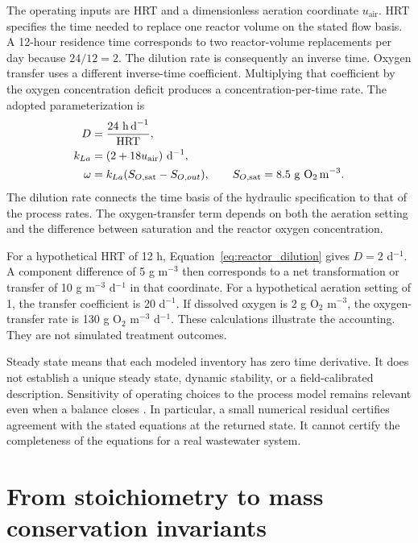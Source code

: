 The operating inputs are HRT and a dimensionless aeration coordinate $u_{\mathrm{air}}$. HRT specifies the time needed to replace one reactor volume on the stated flow basis. A 12-hour residence time corresponds to two reactor-volume replacements per day because $24/12=2$. The dilution rate is consequently an inverse time. Oxygen transfer uses a different inverse-time coefficient. Multiplying that coefficient by the oxygen concentration deficit produces a concentration-per-time rate. The adopted parameterization is
\begin{align}
\equationname{Hydraulic dilution rate from retention time}
D&=\frac{24\ \mathrm{h\,d}^{-1}}{\mathrm{HRT}},\label{eq:reactor_dilution}\\
\equationname{Oxygen-transfer coefficient from the aeration setting}
k_{La}&=(2+18u_{\mathrm{air}})\ \mathrm{d}^{-1},\label{eq:reactor_transfer_coefficient}\\
\equationname{Net oxygen-transfer rate and saturation concentration}
\omega&=k_{La}(S_{O,\mathrm{sat}}-S_{O,out}),\qquad
S_{O,\mathrm{sat}}=8.5\ \mathrm{g\ O_2\,m}^{-3}.
\label{eq:reactor_oxygen_transfer}
\end{align}
The dilution rate connects the time basis of the hydraulic specification to that of the process rates. The oxygen-transfer term depends on both the aeration setting and the difference between saturation and the reactor oxygen concentration.

For a hypothetical HRT of 12 h, Equation~\eqref{eq:reactor_dilution} gives $D=2$ d$^{-1}$. A component difference of 5 g m$^{-3}$ then corresponds to a net transformation or transfer of 10 g m$^{-3}$ d$^{-1}$ in that coordinate. For a hypothetical aeration setting of 1, the transfer coefficient is 20 d$^{-1}$. If dissolved oxygen is 2 g O$_2$ m$^{-3}$, the oxygen-transfer rate is 130 g O$_2$ m$^{-3}$ d$^{-1}$. These calculations illustrate the accounting. They are not simulated treatment outcomes.

Steady state means that each modeled inventory has zero time derivative. It does not establish a unique steady state, dynamic stability, or a field-calibrated description. Sensitivity of operating choices to the process model remains relevant even when a balance closes \citep{Araujo2013}. In particular, a small numerical residual certifies agreement with the stated equations at the returned state. It cannot certify the completeness of the equations for a real wastewater system.

\section{From stoichiometry to mass conservation invariants}

